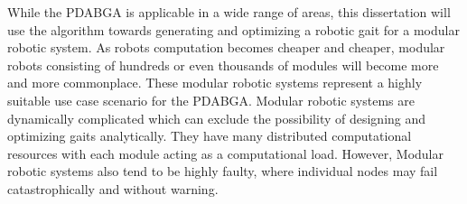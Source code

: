     While the PDABGA is applicable in a wide range of areas,
      this dissertation will use the algorithm towards generating and
      optimizing a robotic gait for a modular robotic system.
    As robots computation becomes cheaper and cheaper, modular robots
      consisting of hundreds or even thousands of modules will become 
      more and more commonplace.
    These modular robotic systems represent a highly suitable use case scenario
      for the PDABGA. 
    Modular robotic systems are dynamically complicated which can exclude the
      possibility of designing and optimizing gaits analytically. 
    They have many distributed computational resources with each module acting
      as a computational load.
    However, Modular robotic systems also tend to be highly faulty, where
      individual nodes may fail catastrophically and without warning.



